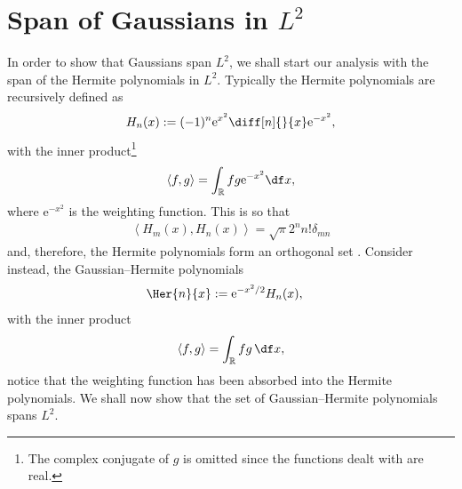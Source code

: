 
\chapter{Span of Gaussians in $L^2$}
\label{chap:gauss}
In order to show that Gaussians span $L^2$, we shall start our analysis with the span of the Hermite polynomials in $L^2$. Typically the Hermite polynomials are recursively defined as \cite{conway, courant, teuwen}
\begin{align*}
H_n(x) := (-1)^n \textrm{e}^{x^2} \diff[n]{}{x} \textrm{e}^{-x^2},
\end{align*}
with the inner product\footnote{The complex conjugate of $g$ is omitted since the functions dealt with are real.}
\begin{align*}
\left< f, g \right> = \int_\mathbb{R} f g \textrm{e}^{-x^2} \df x,
\end{align*}
where $\textrm{e}^{-x^2}$ is the weighting function. This is so that 
\begin{align*}
\left< H_m(x), H_n(x) \right> = \sqrt{\pi} 2^n n! \delta_{mn}
\end{align*}
and, therefore, the Hermite polynomials form an orthogonal set \cite{courant, hochstrasser, kreyszig, szego, teuwen}. Consider instead, the Gaussian--Hermite polynomials
\begin{align*}
\Her{n}{x} &:= \textrm{e}^{-x^2/2} H_n(x),
\end{align*}
with the inner product
\begin{align*}
\left< f, g \right> = \int_\mathbb{R} f g \, \df x,
\end{align*}
notice that the weighting function has been absorbed into the Hermite polynomials. We shall now show that the set of Gaussian--Hermite polynomials spans $L^2$. \\

